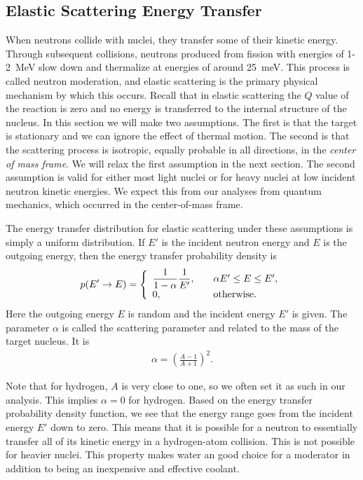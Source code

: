 \subsection{Elastic Scattering Energy Transfer}

When neutrons collide with nuclei, they transfer some of their kinetic energy. Through subsequent collisions, neutrons produced from fission with energies of 1-2~MeV slow down and thermalize at energies of around 25~meV. This process is called neutron moderation, and elastic scattering is the primary physical mechanism by which this occurs. Recall that in elastic scattering the $Q$ value of the reaction is zero and no energy is transferred to the internal structure of the nucleus. In this section we will make two assumptions. The first is that the target is stationary and we can ignore the effect of thermal motion. The second is that the scattering process is isotropic, equally probable in all directions, in the \emph{center of mass frame}. We will relax the first assumption in the next section. The second assumption is valid for either most light nuclei or for heavy nuclei at low incident neutron kinetic energies. We expect this from our analyses from quantum mechanics, which occurred in the center-of-mass frame.

The energy transfer distribution for elastic scattering under these assumptions is simply a uniform distribution. If $E'$ is the incident neutron energy and $E$ is the outgoing energy, then the energy transfer probability density is
\begin{align} \label{Eq:nuclearData_elasticStationaryEnergyTransfer}
  p(E' \rightarrow E ) = \left\{ \begin{array}{l l}
  \dfrac{1}{1 - \alpha} \dfrac{1}{E'}, 	& \quad \alpha E' \le E \le E', \\
  0,									& \quad \text{otherwise}. \end{array} \right.
\end{align}
Here the outgoing energy $E$ is random and the incident energy $E'$ is given. The parameter $\alpha$ is called the scattering parameter and related to the mass of the target nucleus. It is
\begin{align}
  \alpha = \left( \frac{A-1}{A+1} \right)^2 .
\end{align}

Note that for hydrogen, $A$ is very close to one, so we often set it as such in our analysis. This implies $\alpha = 0$ for hydrogen. Based on the energy transfer probability density function, we see that the energy range goes from the incident energy $E'$ down to zero. This means that it is possible for a neutron to essentially transfer all of its kinetic energy in a hydrogen-atom collision. This is not possible for heavier nuclei. This property makes water an good choice for a moderator in addition to being an inexpensive and effective coolant. 

